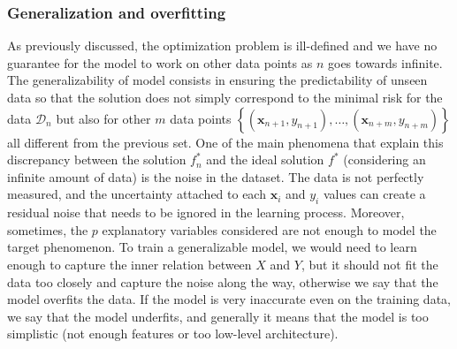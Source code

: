 \documentclass[main]{subfiles}
\begin{document}
\subsubsection{Generalization and overfitting}

As previously discussed, the optimization problem is ill-defined and we have no guarantee for the model to work on other data points as $n$ goes towards infinite. The generalizability of model consists in ensuring the predictability of unseen data so that the solution does not simply correspond to the minimal risk for the data $\mathcal{D}_{n}$ but also for other $m$ data points $\left\{(\mathbf{x}_{n+1},y_{n+1}),\ldots,(\mathbf{x}_{n+m},y_{n+m})\right\}$ all different from the previous set. One of the main phenomena that explain this discrepancy between the solution $f_n^*$ and the ideal solution $f^*$ (considering an infinite amount of data) is the noise in the dataset. The data is not perfectly measured, and the uncertainty attached to each $\mathbf{x}_i$ and $y_i$ values can create a residual noise that needs to be ignored in the learning process. Moreover, sometimes, the $p$ explanatory variables considered are not enough to model the target phenomenon. To train a generalizable model, we would need to learn enough to capture the inner relation between $X$ and $Y$, but it should not fit the data too closely and capture the noise along the way, otherwise we say that the model overfits the data. If the model is very inaccurate even on the training data, we say that the model underfits, and generally it means that the model is too simplistic (not enough features or too low-level architecture). 
\end{document}
